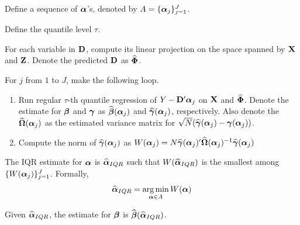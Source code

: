 
\item Define a sequence of $\boldsymbol{\alpha}$'s, denoted by $A = \{\boldsymbol{\alpha}_j\}_{j=1}^J$.

\item Define the quantile level $\tau$.

\item For each variable in $\mathbf{D}$, compute its linear projection on the space
spanned by $\mathbf{X}$ and $\mathbf{Z}$. Denote the predicted $\mathbf{D}$ as $\widehat{\boldsymbol{\Phi}}$.

\item For $j$ from $1$ to $J$, make the following loop.

\begin{enumerate}
	\item Run regular $\tau$-th quantile regression of $Y - \mathbf{D}'\boldsymbol{\alpha}_j$ on
	$\mathbf{X}$ and $\widehat{\boldsymbol{\Phi}}$. Denote the estimate for $\boldsymbol{\beta}$ and
	$\boldsymbol{\gamma}$ as $\widehat{\boldsymbol{\beta}}(\boldsymbol{\alpha}_j)$ and $\widehat{\boldsymbol{\gamma}}(\boldsymbol{\alpha}_j)$,
	respectively.  Also denote the $\widehat{\boldsymbol{\Omega}}(\boldsymbol{\alpha}_j)$ as the estimated
	variance matrix for $\sqrt{N}(\widehat{\boldsymbol{\gamma}}(\boldsymbol{\alpha}_j) -
	\boldsymbol{\gamma}(\boldsymbol{\alpha}_j))$.

	\item Compute the norm of $\widehat{\boldsymbol{\gamma}}(\boldsymbol{\alpha}_j)$ as $W(\boldsymbol{\alpha}_j) =
	N\widehat{\boldsymbol{\gamma}}(\boldsymbol{\alpha}_j)' \widehat{\boldsymbol{\Omega}}(\boldsymbol{\alpha}_j)^{-1}
	\widehat{\boldsymbol{\gamma}}(\boldsymbol{\alpha}_j)$
\end{enumerate}

\item The IQR estimate for $\boldsymbol{\alpha}$ is $\widehat{\boldsymbol{\alpha}}_{IQR}$ such that
$W(\widehat{\boldsymbol{\alpha}}_{IQR})$ is the smallest among $\{W(\boldsymbol{\alpha}_j)\}_{j=1}^J$.
Formally,
\begin{align*}
	\widehat{\boldsymbol{\alpha}}_{IQR} = \operatorname*{arg\,min}_{\boldsymbol{\alpha} \in A} W(\boldsymbol{\alpha})
\end{align*}

\item Given $\widehat{\boldsymbol{\alpha}}_{IQR}$, the estimate for $\boldsymbol{\beta}$ is
$\widehat{\boldsymbol{\beta}}(\widehat{\boldsymbol{\alpha}}_{IQR})$.
